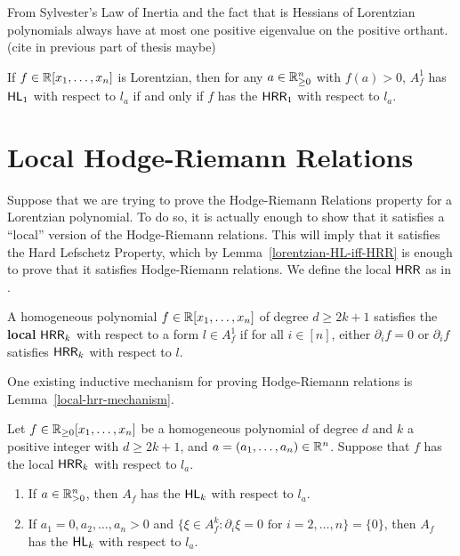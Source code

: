 \documentclass{puthesis-UG}
\begin{document}
From Sylvester's Law of Inertia and the fact that is Hessians of Lorentzian polynomials always have at most one positive eigenvalue on the positive orthant. (cite in previous part of thesis maybe)
\begin{lem} \label{lorentzian-HL-iff-HRR}
	If $f \in \mathbb{R} [x_1, \ldots, x_n]$ is Lorentzian, then for any $a \in \mathbb{R}_{\geq 0}^n$ with $f(a) > 0$, $A_f^1$ has $\mathsf{HL}_1$ with respect to $l_a$ if and only if $f$ has the $\mathsf{HRR}_1$ with respect to $l_a$. 
\end{lem}
\section{Local Hodge-Riemann Relations}

Suppose that we are trying to prove the Hodge-Riemann Relations property for a Lorentzian polynomial. To do so, it is actually enough to show that it satisfies a ``local'' version of the Hodge-Riemann relations. This will imply that it satisfies the Hard Lefschetz Property, which by Lemma~\ref{lorentzian-HL-iff-HRR} is enough to prove that it satisfies Hodge-Riemann relations. We define the local $\mathsf{HRR}$ as in \cite{MNY}. 

\begin{defn}
	A homogeneous polynomial $f \in \mathbb{R}[x_1, \ldots, x_n]$ of degree $d \geq 2k+1$ satisfies the \textbf{local} $\mathsf{HRR}_k$ with respect to a form $l \in A_f^1$ if for all $i \in [n]$, either $\partial_i f = 0$ or $\partial_i f$ satisfies $\mathsf{HRR}_k$ with respect to $l$. 
\end{defn}

One existing inductive mechanism for proving Hodge-Riemann relations is Lemma~\ref{local-hrr-mechanism}. 

\begin{lem}  \label{local-hrr-mechanism}
	Let $f \in \mathbb{R}_{\geq 0}[x_1, \ldots, x_n]$ be a homogeneous polynomial of degree $d$ and $k$ a positive integer with $d \geq 2k+1$, and $a = (a_1, \ldots, a_n) \in \mathbb{R}^n$. Suppose that $f$ has the local $\mathsf{HRR}_k$ with respect to $l_a$. 
	\begin{enumerate}[label = (\roman*)]
		\item If $a \in \mathbb{R}_{> 0}^n$, then $A_f$ has the $\mathsf{HL}_k$ with respect to $l_a$. 
		\item If $a_1 = 0, a_2, \ldots, a_n > 0$ and $\{\xi \in A_f^k : \partial_i \xi = 0 \text{ for $i = 2, \ldots, n$}\} = \{0\}$, then $A_f$ has the $\mathsf{HL}_k$ with respect to $l_a$. 
	\end{enumerate}
\end{lem}
\end{document}
